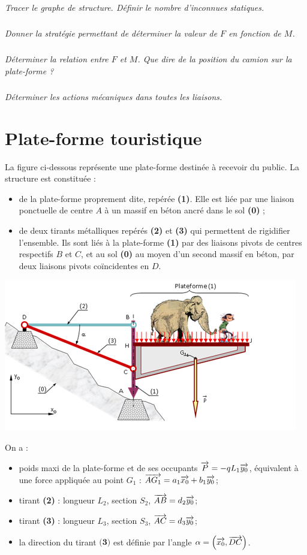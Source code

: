 \documentclass[10pt,fleqn]{article} %
\begin{document}
\begin{multicols}{2}
\subparagraph{}\textit{Tracer le graphe de structure. Définir le nombre d'inconnues statiques.}

\subparagraph{}\textit{Donner la stratégie permettant de déterminer la valeur de $F$ en fonction de $M$.}

\subparagraph{}\textit{Déterminer la relation entre $F$ et $M$. Que dire de la position du camion sur la plate-forme ?}

\subparagraph{}\textit{Déterminer les actions mécaniques dans toutes les liaisons.}


\section*{Plate-forme touristique}
\setcounter{exo}{0}

La figure ci-dessous représente une plate-forme destinée à recevoir du public. La structure est constituée :
\begin{itemize}
\item de la plate-forme proprement dite, repérée \textbf{(1)}. Elle est liée par une liaison ponctuelle de centre $A$ à un massif en béton ancré dans le sol \textbf{(0)} ;
\item de deux tirants métalliques repérés \textbf{(2)} et \textbf{(3)} qui permettent de rigidifier l’ensemble. Ils sont liés à la plate-forme \textbf{(1)} par des liaisons pivots de centres respectifs $B$ et $C$, et au sol \textbf{(0)} au moyen d’un second massif en béton, par deux liaisons pivots coïncidentes en $D$.
\end{itemize}

\begin{center}
\includegraphics[width=.9\linewidth]{images/fig_06}
\end{center}

On a :
\begin{itemize}
\item poids maxi de la plate-forme et de ses occupants $\overrightarrow{P}=-qL_1 \overrightarrow{y_0}$, équivalent à une force appliquée au point $G_1$ : $\overrightarrow{AG_1}=a_1\overrightarrow{x_0} + b_1\overrightarrow{y_0}$;
\item tirant \textbf{(2)} : longueur $L_2$, section $S_2$, $\overrightarrow{AB}=d_2 \overrightarrow{y_0}$;
\item tirant \textbf{(3)} : longueur $L_3$, section $S_3$, $\overrightarrow{AC}=d_3 \overrightarrow{y_0}$;
\item la direction du tirant $\textbf{(3)}$ est définie par l'angle $\alpha=\left(\overrightarrow{x_0},\overrightarrow{DC}\right)$.
\end{itemize}



\end{multicols}
\end{document}
